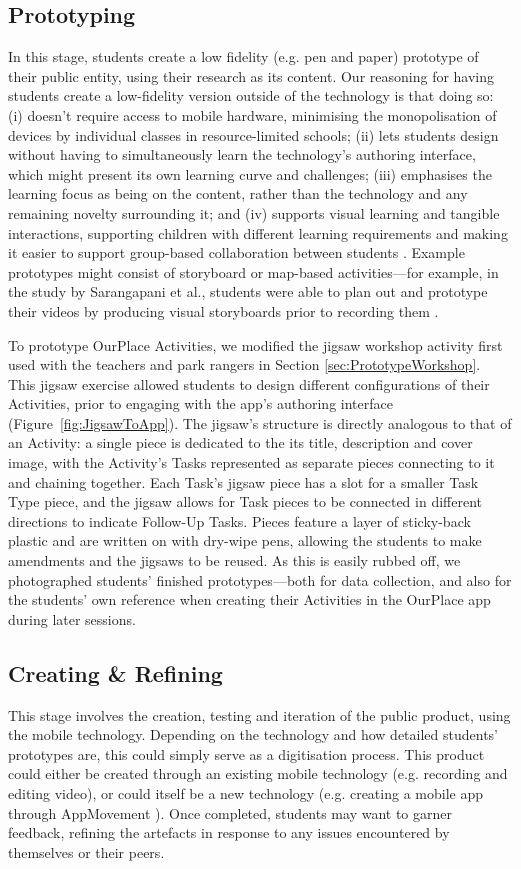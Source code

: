 \subsection{Prototyping}
In this stage, students create a low fidelity (e.g. pen and paper) prototype of their public entity, using their research as its content. Our reasoning for having students create a low-fidelity version outside of the technology is that doing so: (i) doesn't require access to mobile hardware, minimising the monopolisation of devices by individual classes in resource-limited schools; (ii) lets students design without having to simultaneously learn the technology's authoring interface, which might present its own learning curve and challenges; (iii) emphasises the learning focus as being on the content, rather than the technology \cite{Bell2010} and any remaining novelty surrounding it; and (iv) supports visual learning and tangible interactions, supporting children with different learning requirements and making it easier to support group-based collaboration between students \cite{Stanton2001}. Example prototypes might consist of storyboard or map-based activities---for example, in the study by Sarangapani et al., students were able to plan out and prototype their videos by producing visual storyboards prior to recording them \citep{Sarangapani2016}.

To prototype OurPlace Activities, we modified the jigsaw workshop activity first used with the teachers and park rangers in Section \ref{sec:PrototypeWorkshop}. This jigsaw exercise allowed students to design different configurations of their Activities, prior to engaging with the app's authoring interface (Figure~\ref{fig:JigsawToApp}). The jigsaw's structure is directly analogous to that of an Activity: a single piece is dedicated to the its title, description and cover image, with the Activity's Tasks represented as separate pieces connecting to it and chaining together. Each Task's jigsaw piece has a slot for a smaller Task Type piece, and the jigsaw allows for Task pieces to be connected in different directions to indicate Follow-Up Tasks. Pieces feature a layer of sticky-back plastic and are written on with dry-wipe pens, allowing the students to make amendments and the jigsaws to be reused. As this is easily rubbed off, we photographed students' finished prototypes---both for data collection, and also for the students' own reference when creating their Activities in the OurPlace app during later sessions.

\subsection{Creating \& Refining}
This stage involves the creation, testing and iteration of the public product, using the mobile technology. Depending on the technology and how detailed students' prototypes are, this could simply serve as a digitisation process. This product could either be created through an existing mobile technology (e.g. recording and editing video), or could itself be a new technology (e.g. creating a mobile app through AppMovement \citep{Garbett2016}). Once completed, students may want to garner feedback, refining the artefacts in response to any issues encountered by themselves or their peers. 

